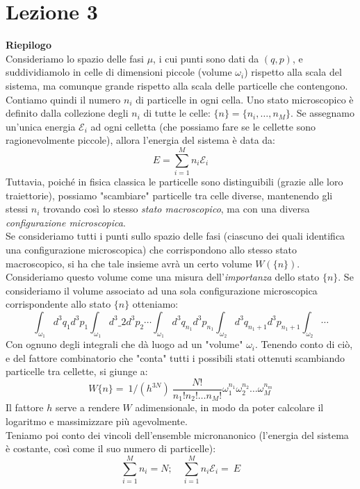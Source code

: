 \documentclass[../MeccanicaStatistica.tex]{subfiles}
\begin{document}
\section{Lezione 3}
{}
\textbf{Riepilogo}\\ %
Consideriamo lo spazio delle fasi $\mu$, i cui punti sono dati da \((q,p)\), e suddividiamolo in celle di dimensioni piccole (volume $\omega_i$) rispetto alla scala del sistema, ma comunque grande rispetto alla scala delle particelle che contengono.\\
Contiamo quindi il numero $n_i$ di particelle in ogni cella. Uno stato microscopico è definito dalla collezione degli $n_i$ di tutte le celle: $\{n\}=\{n_i, \dots, n_M\}$. Se assegnamo un'unica energia $\mathcal{E}_i$ ad ogni celletta (che possiamo fare se le cellette sono ragionevolmente piccole), allora l'energia del sistema è data da:
\[
E = \sum_{i=1}^M n_i\mathcal{E}_i
\]
Tuttavia, poiché in fisica classica le particelle sono distinguibili (grazie alle loro traiettorie), possiamo "scambiare" particelle tra celle diverse, mantenendo gli stessi $n_i$ trovando così lo stesso \textit{stato macroscopico}, ma con una diversa \textit{configurazione microscopica}.\\
Se consideriamo tutti i punti sullo spazio delle fasi (ciascuno dei quali identifica una configurazione microscopica) che corrispondono allo stesso stato macroscopico, si ha che tale insieme avrà un certo volume $W(\{n\})$. Consideriamo questo volume come una misura dell'\textit{importanza} dello stato $\{n\}$. Se consideriamo il volume associato ad una sola configurazione microscopica corrispondente allo stato $\{n\}$ otteniamo:
\[
\int_{\omega_1} d^3 q_1 d^3p_1 \int_{\omega_1} d^3\_2 d^3p_2 \cdots \int_{\omega_1}d^3 q_{n_1}d^3p_{n_1} \int_{\omega_2}d^3 q_{n_1+1}d^3 p_{n_1+1} \int_{\omega_2}\cdots
\]
Con ognuno degli integrali che dà luogo ad un "volume" $\omega_i$. Tenendo conto di ciò, e del fattore combinatorio che "conta" tutti i possibili stati ottenuti scambiando particelle tra cellette, si giunge a:
\[
W\{n\} =\ 1/(h^{3N})\ \frac{N!}{n_1! n_2! \dots n_M!} \omega_1^{n_1} \omega_2^{n_2} \dots \omega_M^{n_m}
\]
Il fattore $h$ serve a rendere $W$ adimensionale, in modo da poter calcolare il logaritmo e massimizzare più agevolmente.\\
Teniamo poi conto dei vincoli dell'ensemble micronanonico (l'energia del sistema è costante, così come il suo numero di particelle):
\[
\sum_{i=1}^M n_i = N; \quad \sum_{i=1}^M n_i \mathcal{E}_i =\ E
\]
\end{document}
